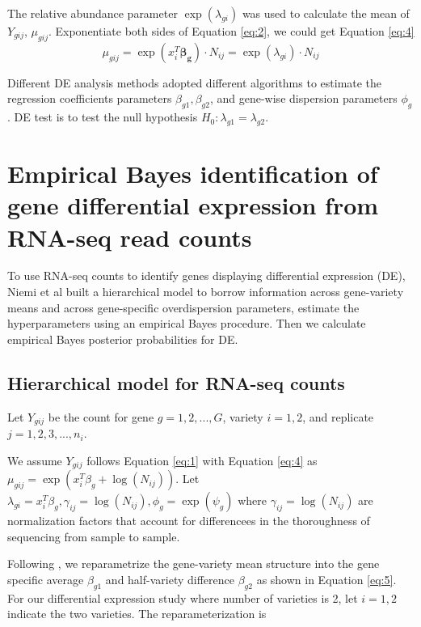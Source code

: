 The relative abundance parameter $\exp(\lambda_{gi})$ was used to calculate the mean of $Y_{gij}$, $\mu_{gij}$. Exponentiate both sides of Equation \eqref{eq:2}, we could get Equation \eqref{eq:4}
\begin{equation}
\label{eq:4}
\mu_{gij} = \exp(x_i ^T \mathbf{\beta_g})\cdot N_{ij} = \exp(\lambda_{gi})\cdot N_{ij}
\end{equation}


Different DE analysis methods adopted different algorithms to estimate the regression coefficients parameters $\beta_{g1}, \beta_{g2}$, and gene-wise dispersion parameters $\phi_g$. DE test is to test the null hypothesis $H_0: \lambda_{g1} = \lambda_{g2}$.


\section{Empirical Bayes identification of gene differential expression from RNA-seq read counts}


To use RNA-seq counts to identify genes displaying differential expression (DE), Niemi et al\citep{niemi2015empirical} built a hierarchical model to borrow information across gene-variety means and across gene-specific overdispersion parameters, estimate the hyperparameters using an empirical Bayes procedure. Then we calculate empirical Bayes posterior probabilities for DE. 

\subsection{Hierarchical model for RNA-seq counts}

Let $Y_{gij}$ be the count for gene $g=1,2,..., G$, variety $i=1,2$, and replicate $j=1,2,3,...,n_i$.

We assume $Y_{gij}$ follows Equation \eqref{eq:1} with Equation \eqref{eq:4} as $\mu_{gij} = \exp(x_i^T \beta_g + \log(N_{ij}))$. Let $\lambda_{gi} = x_i^T \beta_g, \gamma_{ij} =\log(N_{ij}), \phi_g = \exp(\psi_g)$ where $\gamma_{ij} =\log(N_{ij})$ are normalization factors that account for differencees in the thoroughness of sequencing from sample to sample. 

Following \citep{ji2014estimation}, we reparametrize the gene-variety mean structure into the gene specific average $\beta_{g1}$ and half-variety difference $\beta_{g2}$ as shown in Equation \eqref{eq:5}. For our differential expression study where number of varieties is 2, let $i=1,2$ indicate the two varieties. The reparameterization is

